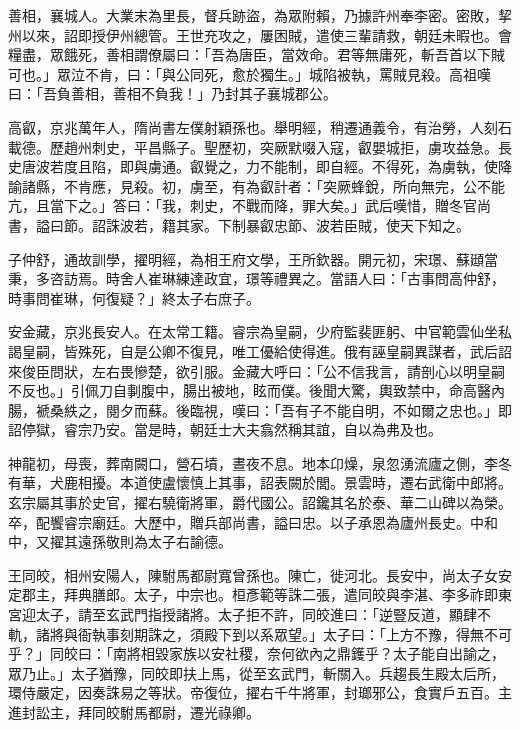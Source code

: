 \begin{pinyinscope}
 善相，襄城人。大業末為里長，督兵跡盜，為眾附賴，乃據許州奉李密。密敗，挈州以來，詔即授伊州總管。王世充攻之，屢困賊，遣使三輩請救，朝廷未暇也。會糧盡，眾餓死，善相謂僚屬曰：「吾為唐臣，當效命。君等無庸死，斬吾首以下賊可也。」眾泣不肯，曰：「與公同死，愈於獨生。」城陷被執，罵賊見殺。高祖嘆曰：「吾負善相，善相不負我！」乃封其子襄城郡公。



 高叡，京兆萬年人，隋尚書左僕射穎孫也。舉明經，稍遷通義令，有治勞，人刻石載德。歷趙州刺史，平昌縣子。聖歷初，突厥默啜入寇，叡嬰城拒，虜攻益急。長史唐波若度且陷，即與虜通。叡覺之，力不能制，即自經。不得死，為虜執，使降諭諸縣，不肯應，見殺。初，虜至，有為叡計者：「突厥蜂銳，所向無完，公不能亢，且當下之。」答曰：「我，刺史，不戰而降，罪大矣。」武后嘆惜，贈冬官尚書，謚曰節。詔誅波若，籍其家。下制暴叡忠節、波若臣賊，使天下知之。



 子仲舒，通故訓學，擢明經，為相王府文學，王所欽器。開元初，宋璟、蘇頲當秉，多咨訪焉。時舍人崔琳練達政宜，璟等禮異之。當語人曰：「古事問高仲舒，時事問崔琳，何復疑？」終太子右庶子。



 安金藏，京兆長安人。在太常工籍。睿宗為皇嗣，少府監裴匪躬、中官範雲仙坐私謁皇嗣，皆殊死，自是公卿不復見，唯工優給使得進。俄有誣皇嗣異謀者，武后詔來俊臣問狀，左右畏慘楚，欲引服。金藏大呼曰：「公不信我言，請剖心以明皇嗣不反也。」引佩刀自剚腹中，腸出被地，眩而僕。後聞大驚，輿致禁中，命高醫內腸，褫桑紩之，閱夕而蘇。後臨視，嘆曰：「吾有子不能自明，不如爾之忠也。」即詔停獄，睿宗乃安。當是時，朝廷士大夫翕然稱其誼，自以為弗及也。



 神龍初，母喪，葬南闕口，營石墳，晝夜不息。地本卬燥，泉忽湧流廬之側，李冬有華，犬鹿相擾。本道使盧懷慎上其事，詔表闕於閭。景雲時，遷右武衛中郎將。玄宗屬其事於史官，擢右驍衛將軍，爵代國公。詔鑱其名於泰、華二山碑以為榮。卒，配饗睿宗廟廷。大歷中，贈兵部尚書，謚曰忠。以子承恩為廬州長史。中和中，又擢其遠孫敬則為太子右諭德。



 王同皎，相州安陽人，陳駙馬都尉寬曾孫也。陳亡，徙河北。長安中，尚太子女安定郡主，拜典膳郎。太子，中宗也。桓彥範等誅二張，遣同皎與李湛、李多祚即東宮迎太子，請至玄武門指授諸將。太子拒不許，同皎進曰：「逆豎反道，顯肆不軌，諸將與衙執事刻期誅之，須殿下到以系眾望。」太子曰：「上方不豫，得無不可乎？」同皎曰：「南將相毀家族以安社稷，奈何欲內之鼎鑊乎？太子能自出諭之，眾乃止。」太子猶豫，同皎即扶上馬，從至玄武門，斬關入。兵趨長生殿太后所，環侍嚴定，因奏誅易之等狀。帝復位，擢右千牛將軍，封瑯邪公，食實戶五百。主進封訟主，拜同皎駙馬都尉，遷光祿卿。




\end{pinyinscope}
